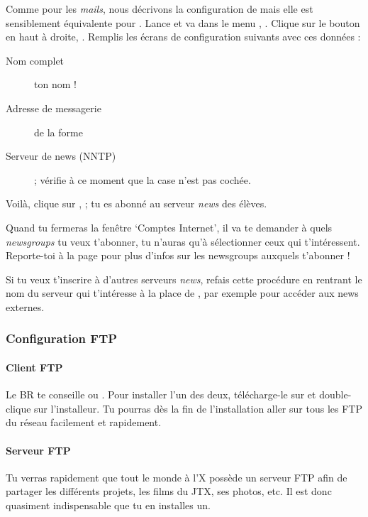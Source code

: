 Comme pour les \emph{mails}, nous décrivons la configuration de  mais elle est sensiblement équivalente pour . Lance
 et va dans le menu , . Clique sur le bouton  en haut à droite,
. Remplis les écrans de configuration suivants avec ces données :
\begin{description}
  \item[Nom complet] ton nom !
  \item[Adresse de messagerie] de la forme 
  \item[Serveur de news (NNTP)] \fkz ; vérifie à ce moment que la case
        n'est pas cochée.
\end{description}
Voilà, clique sur , ; tu es abonné
au serveur \emph{news} des élèves.

Quand tu fermeras la fenêtre `Comptes Internet', il va te demander à
quels \emph{newsgroups} tu veux t'abonner, tu n'auras qu'à sélectionner
ceux qui t'intéressent. Reporte-toi à la page \pageref{newsgroups}
pour plus d'infos sur les newsgroups auxquels t'abonner !

Si tu veux t'inscrire à d'autres serveurs \emph{news}, refais cette
procédure en rentrant le nom du serveur qui t'intéresse à la place
de \fkz, par exemple  pour accéder aux news externes.


\subsubsection{Configuration FTP}

\paragraph{Client FTP}
Le BR te conseille  ou . Pour installer l'un des deux, télécharge-le sur \xshare et double-clique sur l'installeur.
Tu pourras dès la fin de l'installation aller sur tous les FTP du réseau
facilement et rapidement.

\paragraph{Serveur FTP}
Tu verras rapidement que tout le monde à l'X possède un serveur FTP
afin de partager les différents projets, les films du JTX, ses
photos, etc. Il est donc quasiment indispensable que tu en installes
un.

